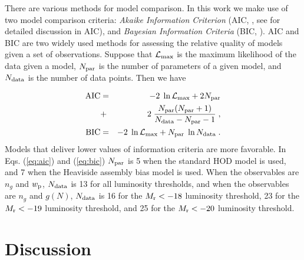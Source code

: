 \documentclass[12pt, preprint]{emulateapj}
\newcommand{\wpp}{w_{\rm p}}
\newcommand{\ngal}{n_{g}}
\newcommand{\gmf}{g(N)}
\newcommand{\mr}{M_{\rm r}}
\begin{document}
There are various methods for model comparison. In this work we make use of two model comparison criteria: \emph{Akaike Information Criterion} (AIC, \citealt{aic} , see \citealt{gelmanic} for detailed discussion in AIC), and \emph{Bayesian Information Criteria} (BIC, \citealt{bic}). AIC and BIC are two widely used methods for assessing the relative quality of models given a set of observations.
Suppose that $\mathcal{L}_{\rm max}$ is the maximum likelihood of the data given a model, $N_{\rm par}$ is the number of parameters of a given model, and $N_{\rm data}$ is the number of data points. Then we have

\begin{eqnarray}
\rm{AIC}&=& -2\;\ln \mathcal{L}_{\rm max} + 2N_{\rm par} \nonumber \\
         &+& 2\;\frac{N_{\rm par}(N_{\rm par}+1)}{N_{\rm data}-N_{\rm par}-1} \; , \label{eq:aic}\\
\rm{BIC}&=& -2\;\ln \mathcal{L}_{\rm max} + N_{\rm par}\;\ln N_{\rm data} \; . \label{eq:bic}
\end{eqnarray}
Models that deliver lower values of information criteria are more favorable. In Eqs. (\ref{eq:aic}) and (\ref{eq:bic}) $N_{\rm par}$ is 5 when the standard HOD model is used, and 7 when the Heaviside assembly bias model is used. When the observables are $\ngal$ and $\wpp$, $N_{\rm data}$ is 13 for all luminosity thresholds, and when the observables are $\ngal$ and $\gmf$, $N_{\rm data}$ is 16 for the $\mr < -18$ luminosity threshold, 23 for the $\mr < -19$ luminosity threshold, and 25 for the $\mr < -20$ luminosity threshold. 




\section{Discussion}



\end{document}
